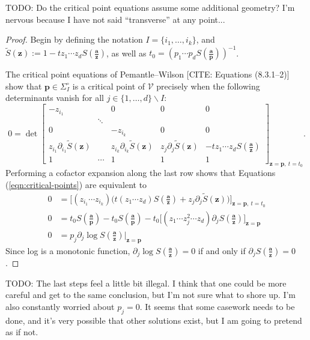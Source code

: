 \documentclass[A4,12pt]{article}
\newcommand{\<}{\left\langle}
\renewcommand{\>}{\right\rangle}
\newcommand{\variety}{\mathcal{V}}
\newcommand{\z}{\mathbf{z}}
\renewcommand{\a}{\mathbf{a}}
\newcommand{\ts}{\textstyle}
\theoremstyle{definition}
\theoremstyle{example}
\begin{document}
TODO: Do the critical point equations assume some additional geometry? I'm nervous because I have not said ``transverse'' at any point...

\begin{proof}
Begin by defining the notation $I=\{i_1,\dots, i_k\}$, and $\tilde{S}(\z) := 1-tz_1\cdots z_dS(\frac{\a}{\z})$, as well as $t_0=\left(p_1\cdots p_d S({\ts\frac{\a}{\mathbf{p}}})\right)^{-1}$.

The critical point equations of Pemantle--Wilson [CITE: Equations (8.3.1--2)] show that $\mathbf{p}\in \Sigma_I^\circ$ is a critical point of $\variety$ precisely when the following determinants vanish for all $j\in \{1,\dots, d\}\smallsetminus I$:
\begin{equation}
\label{eqn:critical-points}
0 = \det \begin{bmatrix}
-z_{i_1} & ~ & 0 & 0 & 0 \\
 &\ddots & ~ & ~ \\
0 & ~ & -z_{i_k} & 0 & 0 \\
z_{i_1}\partial_{i_1} \tilde{S}(\z) & ~ & z_{i_k}\partial_{i_k} \tilde{S}(\z) & z_j\partial_j \tilde{S}(\z) & -tz_1\cdots z_d S(\frac{\a}{\z}) \\
1 & \cdots & 1 & 1 & 1
\end{bmatrix}_{\z=\mathbf{p},~ t=t_0}.
\end{equation}
 Performing a cofactor expansion along the last row shows that Equations (\ref{eqn:critical-points}) are equivalent to
\begin{align*}
0 &= \Big[ (z_{i_1}\cdots z_{i_k})\big( t(z_{1}\cdots z_d)S({\ts\frac{\a}{\z}})+z_j\partial_j \tilde{S}(\z)\big)\Big]_{\z=\mathbf{p},~ t=t_0} \\
0 &= t_0S({\ts\frac{\a}{\mathbf{p}}})-t_0S({\ts\frac{\a}{\mathbf{p}}})-t_0\Big[(z_1\cdots z_j^2\cdots z_d)\partial_j S({\ts\frac{\a}{\z}})\Big]_{\z=\mathbf{p}} \\
0 &= p_j \partial_j \log S({\ts\frac{\a}{\z}})\Big\vert_{\z=\mathbf{p}}
\end{align*}
Since log is a monotonic function, $\partial_j \log S({\ts\frac{\a}{\z}})=0$ if and only if $\partial_j S({\ts\frac{\a}{\z}})=0$.
\end{proof}

TODO: The last steps feel a little bit illegal. I think that one could be more careful and get to the same conclusion, but I'm not sure what to shore up. I'm also constantly worried about $p_j=0$. It seems that some casework needs to be done, and it's very possible that other solutions exist, but I am going to pretend as if not.
\end{document}
